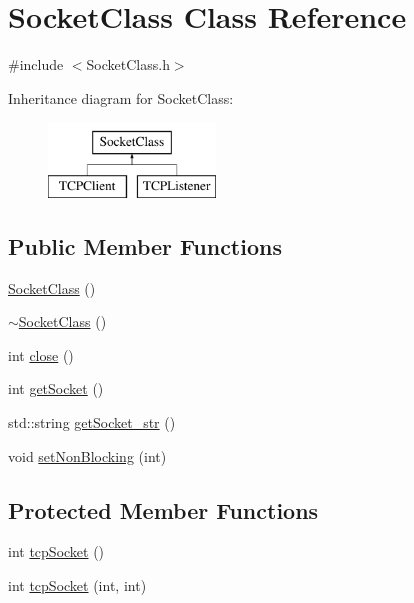 \hypertarget{classSocketClass}{\section{\-Socket\-Class \-Class \-Reference}
\label{classSocketClass}
}


{\ttfamily \#include $<$\-Socket\-Class.\-h$>$}

\-Inheritance diagram for \-Socket\-Class\-:\begin{figure}[H]
\begin{center}
\leavevmode
\includegraphics[height=2.000000cm]{classSocketClass}
\end{center}
\end{figure}
\subsection*{\-Public \-Member \-Functions}
\begin{DoxyCompactItemize}
\item 
\hyperlink{classSocketClass_a5ede881906dd99969280416e57713e6e}{\-Socket\-Class} ()
\item 
\hyperlink{classSocketClass_acb8c3d838def69ca9b596f4eeb082d65}{$\sim$\-Socket\-Class} ()
\item 
int \hyperlink{classSocketClass_ad628b8cf3503f4b3ff2f746f8f97222b}{close} ()
\item 
int \hyperlink{classSocketClass_a3cf341f54677aa0ebe3ffc51b663a2b1}{get\-Socket} ()
\item 
std\-::string \hyperlink{classSocketClass_a51c5674277badcbbd7d62fee52dc7cdb}{get\-Socket\-\_\-str} ()
\item 
void \hyperlink{classSocketClass_a12c2c67ee4907847be8d1067d8c211f5}{set\-Non\-Blocking} (int)
\end{DoxyCompactItemize}
\subsection*{\-Protected \-Member \-Functions}
\begin{DoxyCompactItemize}
\item 
int \hyperlink{classSocketClass_a1704e54e57a2aa6685148e37073fce6e}{tcp\-Socket} ()
\item 
int \hyperlink{classSocketClass_a27878d51b79e563cb8f7aa6a1d8c11d7}{tcp\-Socket} (int, int)
\end{DoxyCompactItemize}
